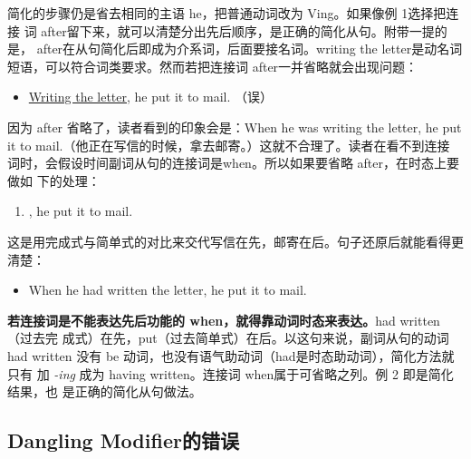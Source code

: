 简化的步骤仍是省去相同的主语 he，把普通动词改为 Ving。如果像例 1选择把连接
词 after留下来，就可以清楚分出先后顺序，是正确的简化从句。附带一提的
是， after在从句简化后即成为介系词，后面要接名词。writing the letter是动名词
短语，可以符合词类要求。然而若把连接词 after一并省略就会出现问题：
\begin{itemize}
\item \ul{Writing the letter}, he put it to mail. （误）
\end{itemize}
因为 after 省略了，读者看到的印象会是：When he was writing the letter, he
put it to mail.（他正在写信的时候，拿去邮寄。）这就不合理了。读者在看不到连接
词时，会假设时间副词从句的连接词是when。所以如果要省略 after，在时态上要做如
下的处理：
\begin{enumerate}[resume]
\item {}, he put it to mail.
\end{enumerate}
这是用完成式与简单式的对比来交代写信在先，邮寄在后。句子还原后就能看得更清楚：
\begin{itemize}
\item When he had written the letter, he put it to mail.
\end{itemize}
\textbf{若连接词是不能表达先后功能的 when，就得靠动词时态来表达。}had written（过去完
成式）在先，put（过去简单式）在后。以这句来说，副词从句的动词had
written 没有 be 动词，也没有语气助动词（had是时态助动词），简化方法就只有
加 \emph{-ing} 成为 having written。连接词 when属于可省略之列。例 2 即是简化结果，也
是正确的简化从句做法。

\subsection{Dangling Modifier的错误}

